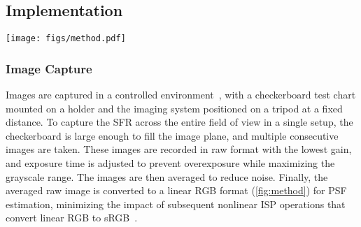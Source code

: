 \subsection{Implementation}
\begin{figure*}
\centering
    \texttt{[image: figs/method.pdf]}
    \setlength{\abovecaptionskip}{-0.5cm} 
    \caption{Diagram of the proposed two-step PSF estimation framework, the first step involves learning monochromatic aberration per normalized image height $\mathrm{H}$. The network $\mathcal{G}_{\Theta1}$ processes $\mathrm{H}$ and $\mathrm{H}^2$ to output coefficients, generate wavefront aberration and transform it into the $\mbox{PSF}^*$, followed by calculating the modulation transfer function $\mbox{MTF}^*$, resulting in the spatial frequency response ( $\mbox{SFR}^*$) curve. Concurrently, a real $\mbox{SFR}$ curve at the same $\mathrm{H}$ of one color channel is derived from real capture. Discrepancies between these curves guide $\mathcal{G}_{\Theta1}$ to faithfully represent real aberration. The second step focuses on learning PSF shifts across channels. Using $\mathrm{H}$ as input, $\mathcal{G}_{\Theta2}$ calculates shifts, generates shifted PSF, and produces chromatic areas $\mbox{CA}^*$ through a physical process. Real chromatic areas $\mbox{CA}$ data at the same $\mathrm{H}$ are obtained from captures, the disparities between the two data guiding $\mathcal{G}_{\Theta2}$ to output $\mbox{CA}^*$ faithfully representing reality.  These two steps enable the learning of spatial-variant PSF of the whole imaging system.}
    \label{fig:method}
    \vspace{-0.0cm}     
\end{figure*}


\subsubsection{Image Capture}
\label{image capture}


Images are captured in a controlled environment~\cite{ISO12233-2014}, with a checkerboard test chart mounted on a holder and the imaging system positioned on a tripod at a fixed distance. To capture the SFR across the entire field of view in a single setup, the checkerboard is large enough to fill the image plane, and multiple consecutive images are taken. These images are recorded in raw format with the lowest gain, and exposure time is adjusted to prevent overexposure while maximizing the grayscale range. The images are then averaged to reduce noise. Finally, the averaged raw image is converted to a linear RGB format (\cref{fig:method}) for PSF estimation, minimizing the impact of subsequent nonlinear ISP operations that convert linear RGB to sRGB~\cite{brooks2019unprocessing}.



